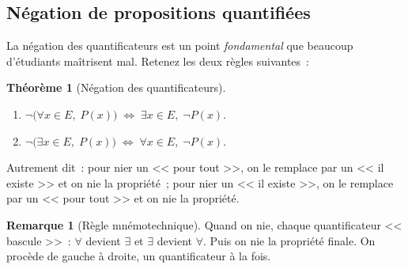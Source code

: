 \documentclass[12pt,a4paper,openany]{book}
\theoremstyle{definition}
\newtheorem{theoreme}{Théorème}[chapter]
\newtheorem{remarque}{Remarque}[chapter]
\begin{document}
\subsection{Négation de propositions quantifiées}
\label{subsec:negation-quant}

La négation des quantificateurs est un point \emph{fondamental} que beaucoup d'étudiants maîtrisent mal. Retenez les deux règles suivantes~:

\begin{theoreme}[Négation des quantificateurs]\label{thm:neg-quant}
  \begin{enumerate}[label=(\roman*)]
    \item $\lnot\bigl(\forall x \in E,\; P(x)\bigr) \;\Leftrightarrow\; \exists x \in E,\; \lnot P(x)$.
    \item $\lnot\bigl(\exists x \in E,\; P(x)\bigr) \;\Leftrightarrow\; \forall x \in E,\; \lnot P(x)$.
  \end{enumerate}
  Autrement dit~: pour nier un << pour tout >>, on le remplace par un << il existe >> et on nie la propriété~; pour nier un << il existe >>, on le remplace par un << pour tout >> et on nie la propriété.
\end{theoreme}

\begin{remarque}[Règle mnémotechnique]\label{rem:mnemo-neg}
  Quand on nie, chaque quantificateur << bascule >>~: $\forall$ devient $\exists$ et $\exists$ devient $\forall$. Puis on nie la propriété finale. On procède de gauche à droite, un quantificateur à la fois.
\end{remarque}
\end{document}
